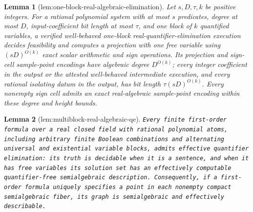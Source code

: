 \documentclass{article}
\newtheorem{lemma}{Lemma}
\begin{document}
\begin{lemma}[lem:one-block-real-algebraic-elimination]\label{lem:one-block-real-algebraic-elimination}
Let \(s,D,\tau,k\) be positive integers.  For a rational polynomial system with at most \(s\) predicates, degree at most \(D\), input-coefficient bit length at most \(\tau\), and one block of \(k\) quantified variables, a verified well-behaved one-block real-quantifier-elimination execution decides feasibility and computes a projection with one free variable using \((sD)^{O(k)}\) exact scalar arithmetic and sign operations.  Its projection and sign-cell sample-point encodings have algebraic degree \(D^{O(k)}\); every integer coefficient in the output or the attested well-behaved intermediate execution, and every rational isolating datum in the output, has bit length \(\tau(sD)^{O(k)}\).  Every nonempty sign cell admits an exact real-algebraic sample-point encoding within these degree and height bounds.
\end{lemma}

\begin{lemma}[lem:multiblock-real-algebraic-qe]\label{lem:multiblock-real-algebraic-qe}
\texttt{Every finite first-\allowbreak{}order formula over a real closed field with rational polynomial atoms,\allowbreak{} including arbitrary finite Boolean combinations and alternating universal and existential variable blocks,\allowbreak{} admits effective quantifier elimination:\allowbreak{} its truth is decidable when it is a sentence,\allowbreak{} and when it has free variables its solution set has an effectively computable quantifier-\allowbreak{}free semialgebraic description. Consequently,\allowbreak{} if a first-\allowbreak{}order formula uniquely specifies a point in each nonempty compact semialgebraic fiber,\allowbreak{} its graph is semialgebraic and effectively describable.}
\end{lemma}
\end{document}
